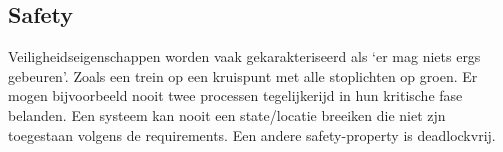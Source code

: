 \documentclass{article}
\begin{document}
	\subsection{Safety}
	
	
	Veiligheidseigenschappen worden vaak gekarakteriseerd als ‘er mag niets ergs gebeuren’. Zoals een trein op een kruispunt met  alle stoplichten op groen. Er mogen bijvoorbeeld nooit twee processen tegelijkerijd in hun kritische fase belanden. Een systeem kan nooit een state/locatie breeiken die niet zjn toegestaan volgens de requirements. Een andere safety-property is deadlockvrij.
	
 

\end{document}
